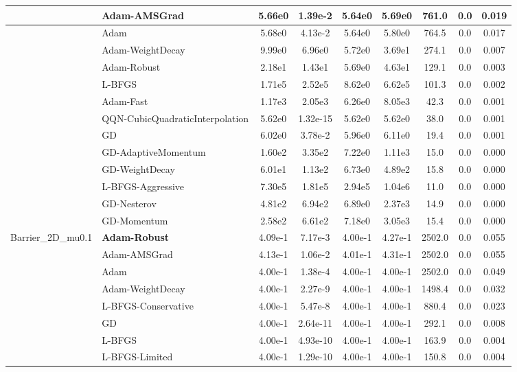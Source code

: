 \documentclass{article}
\begin{document}
\begin{longtable}{|l|l|c|c|c|c|c|c|c|}
\hline
 & Adam-AMSGrad & 5.66e0 & 1.39e-2 & 5.64e0 & 5.69e0 & 761.0 & 0.0 & 0.019 \\
\hline
 & Adam & 5.68e0 & 4.13e-2 & 5.64e0 & 5.80e0 & 764.5 & 0.0 & 0.017 \\
\hline
 & Adam-WeightDecay & 9.99e0 & 6.96e0 & 5.72e0 & 3.69e1 & 274.1 & 0.0 & 0.007 \\
\hline
 & Adam-Robust & 2.18e1 & 1.43e1 & 5.69e0 & 4.63e1 & 129.1 & 0.0 & 0.003 \\
\hline
 & L-BFGS & 1.71e5 & 2.52e5 & 8.62e0 & 6.62e5 & 101.3 & 0.0 & 0.002 \\
\hline
 & Adam-Fast & 1.17e3 & 2.05e3 & 6.26e0 & 8.05e3 & 42.3 & 0.0 & 0.001 \\
\hline
 & QQN-CubicQuadraticInterpolation & 5.62e0 & 1.32e-15 & 5.62e0 & 5.62e0 & 38.0 & 0.0 & 0.001 \\
\hline
 & GD & 6.02e0 & 3.78e-2 & 5.96e0 & 6.11e0 & 19.4 & 0.0 & 0.001 \\
\hline
 & GD-AdaptiveMomentum & 1.60e2 & 3.35e2 & 7.22e0 & 1.11e3 & 15.0 & 0.0 & 0.000 \\
\hline
 & GD-WeightDecay & 6.01e1 & 1.13e2 & 6.73e0 & 4.89e2 & 15.8 & 0.0 & 0.000 \\
\hline
 & L-BFGS-Aggressive & 7.30e5 & 1.81e5 & 2.94e5 & 1.04e6 & 11.0 & 0.0 & 0.000 \\
\hline
 & GD-Nesterov & 4.81e2 & 6.94e2 & 6.89e0 & 2.37e3 & 14.9 & 0.0 & 0.000 \\
\hline
 & GD-Momentum & 2.58e2 & 6.61e2 & 7.18e0 & 3.05e3 & 15.4 & 0.0 & 0.000 \\
Barrier\_2D\_mu0.1 & \textbf{Adam-Robust} & 4.09e-1 & 7.17e-3 & 4.00e-1 & 4.27e-1 & 2502.0 & 0.0 & 0.055 \\
\hline
 & Adam-AMSGrad & 4.13e-1 & 1.06e-2 & 4.01e-1 & 4.31e-1 & 2502.0 & 0.0 & 0.055 \\
\hline
 & Adam & 4.00e-1 & 1.38e-4 & 4.00e-1 & 4.00e-1 & 2502.0 & 0.0 & 0.049 \\
\hline
 & Adam-WeightDecay & 4.00e-1 & 2.27e-9 & 4.00e-1 & 4.00e-1 & 1498.4 & 0.0 & 0.032 \\
\hline
 & L-BFGS-Conservative & 4.00e-1 & 5.47e-8 & 4.00e-1 & 4.00e-1 & 880.4 & 0.0 & 0.023 \\
\hline
 & GD & 4.00e-1 & 2.64e-11 & 4.00e-1 & 4.00e-1 & 292.1 & 0.0 & 0.008 \\
\hline
 & L-BFGS & 4.00e-1 & 4.93e-10 & 4.00e-1 & 4.00e-1 & 163.9 & 0.0 & 0.004 \\
\hline
 & L-BFGS-Limited & 4.00e-1 & 1.29e-10 & 4.00e-1 & 4.00e-1 & 150.8 & 0.0 & 0.004 \\

\end{longtable}
\end{document}
